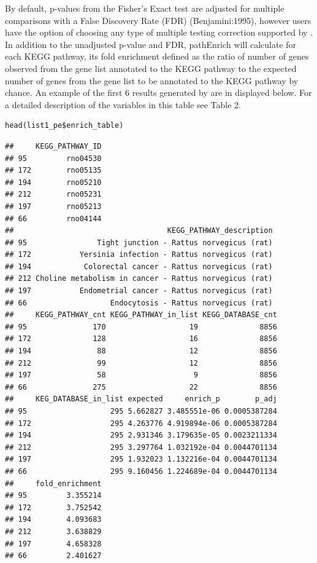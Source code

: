 \documentclass[article]{jss}\usepackage[]{graphicx}\usepackage[]{color}
\makeatletter
\newenvironment{kframe}{%
 \def\at@end@of@kframe{}%
 \ifinner\ifhmode%
  \def\at@end@of@kframe{\end{minipage}}%
  \begin{minipage}{\columnwidth}%
 \fi\fi%
 \def\FrameCommand##1{\hskip\@totalleftmargin \hskip-\fboxsep
 \colorbox{shadecolor}{##1}\hskip-\fboxsep
     \hskip-\linewidth \hskip-\@totalleftmargin \hskip\columnwidth}%
 \MakeFramed {\advance\hsize-\width
   \@totalleftmargin\z@ \linewidth\hsize
   \@setminipage}}%
 {\par\unskip\endMakeFramed%
 \at@end@of@kframe}
\newenvironment{knitrout}{}{} %
\makeatother
\begin{document}
By default, p-values from the Fisher’s Exact test are adjusted for multiple
comparisons with a False Discovery Rate (FDR) (Benjamini:1995), however users
have the option of choosing any type of multiple testing correction supported
by . In addition to the unadjusted p-value and FDR, pathEnrich
will calculate for each KEGG pathway, its fold enrichment defined as the ratio
of number of genes observed from the gene list annotated to the KEGG pathway to
the expected number of genes from the gene list to be annotated to the KEGG
pathway by chance. An example of the first 6 results generated by 
are in displayed below. For a detailed description of the variables in this table see Table 2.

\begin{knitrout}
\color{fgcolor}\begin{kframe}
\begin{lstlisting}[basicstyle=\ttfamily,breaklines=true]
head(list1_pe$enrich_table)\end{lstlisting}
\begin{lstlisting}[basicstyle=\ttfamily,breaklines=true]
##     KEGG_PATHWAY_ID
## 95         rno04530
## 172        rno05135
## 194        rno05210
## 212        rno05231
## 197        rno05213
## 66         rno04144
##                                   KEGG_PATHWAY_description
## 95                Tight junction - Rattus norvegicus (rat)
## 172           Yersinia infection - Rattus norvegicus (rat)
## 194            Colorectal cancer - Rattus norvegicus (rat)
## 212 Choline metabolism in cancer - Rattus norvegicus (rat)
## 197           Endometrial cancer - Rattus norvegicus (rat)
## 66                   Endocytosis - Rattus norvegicus (rat)
##     KEGG_PATHWAY_cnt KEGG_PATHWAY_in_list KEGG_DATABASE_cnt
## 95               170                   19              8856
## 172              128                   16              8856
## 194               88                   12              8856
## 212               99                   12              8856
## 197               58                    9              8856
## 66               275                   22              8856
##     KEG_DATABASE_in_list expected     enrich_p        p_adj
## 95                   295 5.662827 3.485551e-06 0.0005387284
## 172                  295 4.263776 4.919894e-06 0.0005387284
## 194                  295 2.931346 3.179635e-05 0.0023211334
## 212                  295 3.297764 1.032192e-04 0.0044701134
## 197                  295 1.932023 1.132216e-04 0.0044701134
## 66                   295 9.160456 1.224689e-04 0.0044701134
##     fold_enrichment
## 95         3.355214
## 172        3.752542
## 194        4.093683
## 212        3.638829
## 197        4.658328
## 66         2.401627
\end{lstlisting}
\end{kframe}
\end{knitrout}
\end{document}
